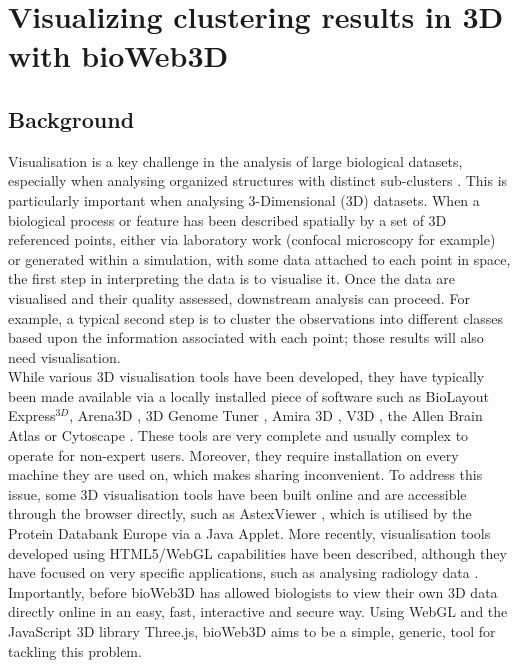 	

\section{Visualizing clustering results in 3D with bioWeb3D}
	\subsection{Background}

Visualisation is a key challenge in the analysis of large biological datasets, especially when analysing organized structures with distinct sub-clusters \cite{Rubel10}. This is particularly important when analysing 3-Dimensional (3D) datasets. When a biological process or feature has been described spatially by a set of 3D referenced points, either via laboratory work (confocal microscopy for example) or generated within a simulation, with some data attached to each point in space, the first step in interpreting the data is to visualise it. Once the data are visualised and their quality assessed, downstream analysis can proceed. For example, a typical second step is to cluster the observations into different classes based upon the information associated with each point; those results will also need visualisation. \\

While various 3D visualisation tools have been developed, they have typically been made available via a locally installed piece of software such as BioLayout Express$^{3D}$\cite{Freeman07}, Arena3D \cite{Pavlopoulos08},  3D Genome Tuner \cite{Wang093D}, Amira 3D \cite{Stalling05}, V3D \cite{Peng10}, the Allen Brain Atlas \cite{Lein07} or Cytoscape \cite{Shannon03}. These tools are very complete and usually complex to operate for non-expert users. Moreover, they require installation on every machine they are used on, which makes sharing inconvenient. To address this issue, some 3D visualisation tools have been built online and are accessible through the browser directly, such as AstexViewer \cite{Hartshorn02}, which is utilised by the Protein Databank Europe via a Java Applet. More recently, visualisation tools developed using HTML5/WebGL capabilities have been described, although they have focused on very specific applications, such as analysing radiology data  \cite{Dinesh12}.\\
Importantly, before bioWeb3D \cite{Pettit13} has allowed biologists to view their own 3D data directly online in an easy, fast, interactive and secure way. Using WebGL and the JavaScript 3D library Three.js, bioWeb3D aims to be a simple, generic, tool for tackling this problem.\\

